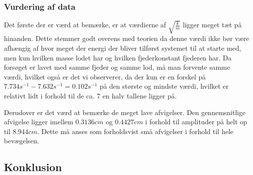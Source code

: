 \subsubsection{Vurdering af data}
Det første der er værd at bemærke, er at værdierne af $\sqrt{\frac{k}{m}}$ ligger meget tæt på hinanden. 
Dette stemmer godt overens med teorien da denne værdi ikke bør være afhængig af hvor meget der energi der bliver tilførst systemet til at starte med, men kun hvilken masse lodet har og hvilken fjederkonstant fjederen har. 
Da forsøget er lavet med samme fjeder og samme lod, må man forvente samme værdi, hvilket også er det vi observerer, da der kun er en forskel på $7.734s^{-1}-7.632s^{-1}=0.102s^{-1}$ på den største og mindste værdi, hvilket er relativt lidt i forhold til de ca. 7 en halv tallene ligger på.



Derudover er det værd at bemærke de meget lave afvigelser. 
Den gennemsnitlige afvigelse ligger imellem $0.3136cm$ og $0.4427cm$ i forhold til amplituder på helt op til $8.944cm$. 
Dette må anses som forholdsvist små afvigelser i forhold til hele bevægelsen.


\subsection{Konklusion}


